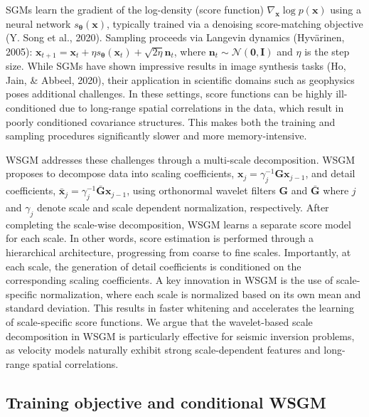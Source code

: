 \documentclass{IMAGE2025}
\begin{document}
SGMs learn the gradient of the log-density (score function)
\(\nabla_{\mathbf{x}} \log p(\mathbf{x})\) using a neural network
\(s_{\boldsymbol{\theta}}(\mathbf{x})\), typically trained via a
denoising score-matching objective (Y. Song et al., 2020). Sampling
proceeds via Langevin dynamics (Hyvärinen, 2005):
\(\mathbf{x}_{t+1} = \mathbf{x}_t + \eta s_{\boldsymbol{\theta}}(\mathbf{x}_t) + \sqrt{2 \eta} \mathbf{n}_t\),
where \(\mathbf{n}_t \sim \mathcal{N}(\mathbf{0}, \mathbf{I})\) and
\(\eta\) is the step size. While SGMs have shown impressive results in
image synthesis tasks (Ho, Jain, \& Abbeel, 2020), their application in
scientific domains such as geophysics poses additional challenges. In
these settings, score functions can be highly ill-conditioned due to
long-range spatial correlations in the data, which result in poorly
conditioned covariance structures. This makes both the training and
sampling procedures significantly slower and more memory-intensive.

WSGM addresses these challenges through a multi-scale decomposition.
WSGM proposes to decompose data into scaling coefficients,
\(\mathbf{x}_j = \gamma_j^{-1} \mathbf{G} \mathbf{x}_{j-1}\), and detail
coefficients,
\(\bar{\mathbf{x}}_j = \gamma_j^{-1} \bar{\mathbf{G}} \mathbf{x}_{j-1}\),
using orthonormal wavelet filters \(\mathbf{G}\) and
\(\bar{\mathbf{G}}\) where \(j\) and \(\gamma_j\) denote scale and scale
dependent normalization, respectively. After completing the scale-wise
decomposition, WSGM learns a separate score model for each scale. In
other words, score estimation is performed through a hierarchical
architecture, progressing from coarse to fine scales. Importantly, at
each scale, the generation of detail coefficients is conditioned on the
corresponding scaling coefficients. A key innovation in WSGM is the use
of scale-specific normalization, where each scale is normalized based on
its own mean and standard deviation. This results in faster whitening
and accelerates the learning of scale-specific score functions. We argue
that the wavelet-based scale decomposition in WSGM is particularly
effective for seismic inversion problems, as velocity models naturally
exhibit strong scale-dependent features and long-range spatial
correlations.

\subsection{Training objective and conditional
WSGM}\label{training-objective-and-conditional-wsgm}
\end{document}
